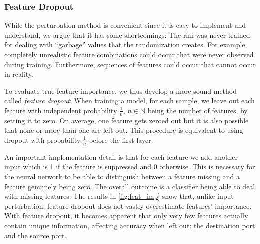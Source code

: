 \documentclass[conference]{IEEEtran}
\begin{document}
\subsubsection{Feature Dropout}
While the perturbation method %
is convenient since it is easy to implement and understand, we argue that it has some shortcomings:
The \gls{rnn} was never trained for dealing with ``garbage'' values that the randomization creates. For example, completely unrealistic feature combinations could occur that were never observed during training. Furthermore, sequences of features could occur that cannot occur in reality.


To evaluate true feature importance, we thus develop a more sound method %
called \textit{feature dropout}: When training a model, for each sample, we leave out each feature  with independent probability $\frac{1}{n}$, $n \in \mathbb N$ being the number of features, by setting it to zero. On average, one feature gets zeroed out but it is also possible that none or more than one are left out. This procedure is equivalent to using dropout \cite{srivastava_dropout:_2014} with probability $\frac{1}{n}$ before the first layer.

An important implementation detail is that for each feature we add another input which is 1 if the feature is suppressed and 0 otherwise. This is necessary for the neural network to be able to distinguish between a feature missing and a feature genuinely being zero. The overall outcome is a classifier being able to deal with missing features.
The results in \autoref{fig:feat_imp} show that, unlike input perturbation, feature dropout  does not vastly overestimate features' importance. With feature dropout, it becomes apparent that only very few features  actually contain unique information, affecting accuracy when left out: the destination port and the source port.
\end{document}
